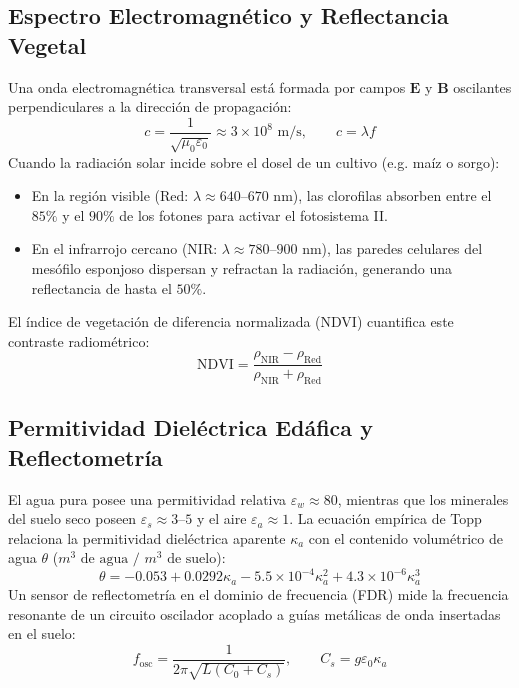 \documentclass[12pt,spanish,letterpaper,oneside]{article}
\begin{document}
\subsection{Espectro Electromagnético y Reflectancia Vegetal}
Una onda electromagnética transversal está formada por campos $\mathbf{E}$ y $\mathbf{B}$ oscilantes perpendiculares a la dirección de propagación:
\begin{equation}
    c = \frac{1}{\sqrt{\mu_0 \varepsilon_0}} \approx 3 \times 10^8\text{ m/s}, \qquad c = \lambda f
\end{equation}
Cuando la radiación solar incide sobre el dosel de un cultivo (e.g. maíz o sorgo):
\begin{itemize}
    \item En la región visible (Red: $\lambda \approx 640\text{--}670\text{ nm}$), las clorofilas absorben entre el $85\%$ y el $90\%$ de los fotones para activar el fotosistema II.
    \item En el infrarrojo cercano (NIR: $\lambda \approx 780\text{--}900\text{ nm}$), las paredes celulares del mesófilo esponjoso dispersan y refractan la radiación, generando una reflectancia de hasta el $50\%$.
\end{itemize}
El índice de vegetación de diferencia normalizada (NDVI) cuantifica este contraste radiométrico:
\begin{equation}
    \mathrm{NDVI} = \frac{\rho_{\mathrm{NIR}} - \rho_{\mathrm{Red}}}{\rho_{\mathrm{NIR}} + \rho_{\mathrm{Red}}}
\end{equation}

\subsection{Permitividad Dieléctrica Edáfica y Reflectometría}
El agua pura posee una permitividad relativa $\varepsilon_w \approx 80$, mientras que los minerales del suelo seco poseen $\varepsilon_s \approx 3\text{--}5$ y el aire $\varepsilon_a \approx 1$.
La ecuación empírica de Topp relaciona la permitividad dieléctrica aparente $\kappa_a$ con el contenido volumétrico de agua $\theta$ ($m^3\text{ de agua / }m^3\text{ de suelo}$):
\begin{equation}
    \theta = -0.053 + 0.0292 \kappa_a - 5.5 \times 10^{-4} \kappa_a^2 + 4.3 \times 10^{-6} \kappa_a^3
\end{equation}
Un sensor de reflectometría en el dominio de frecuencia (FDR) mide la frecuencia resonante de un circuito oscilador acoplado a guías metálicas de onda insertadas en el suelo:
\begin{equation}
    f_{\mathrm{osc}} = \frac{1}{2\pi \sqrt{L (C_0 + C_s)}}, \qquad C_s = g \varepsilon_0 \kappa_a
\end{equation}
\end{document}
